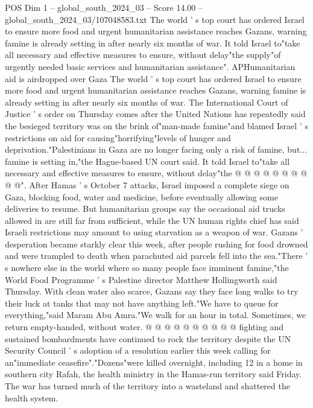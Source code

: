 \begin{textsample}{POS Dim 1 – global\_south\_2024\_03 – Score 14.00 – global\_south\_2024\_03/107048583.txt}  \label{ex:f1_pos_345}
The world ' s top court has ordered Israel to ensure more food and urgent humanitarian assistance reaches Gazans, warning famine is already setting in after nearly six months of war.
It told Israel to"take all necessary and effective measures to ensure, without delay"the supply"of urgently needed basic services and humanitarian assistance".
APHumanitarian aid is airdropped over Gaza The world ' s top court has ordered Israel to ensure more food and urgent humanitarian assistance reaches Gazans, warning famine is already setting in after nearly six months of war.
The International Court of Justice ' s order on Thursday comes after the United Nations has repeatedly said the besieged territory was on the brink of"man-made famine"and blamed Israel ' s restrictions on aid for causing"horrifying"levels of hunger and deprivation."Palestinians in Gaza are no longer facing only a risk of famine, but... famine is setting in,"the Hague-based UN court said.
It told Israel to"take all necessary and effective measures to ensure, without delay"the @ @ @ @ @ @ @ @ @ @".
After Hamas ' s October 7 attacks, Israel imposed a complete siege on Gaza, blocking food, water and medicine, before eventually allowing some deliveries to resume.
But humanitarian groups say the occasional aid trucks allowed in are still far from sufficient, while the UN human rights chief has said Israeli restrictions may amount to using starvation as a weapon of war.
Gazans ' desperation became starkly clear this week, after people rushing for food drowned and were trampled to death when parachuted aid parcels fell into the sea."There ' s nowhere else in the world where so many people face imminent famine,"the World Food Programme ' s Palestine director Matthew Hollingworth said Thursday.
With clean water also scarce, Gazans say they face long walks to try their luck at tanks that may not have anything left."We have to queue for everything,"said Maram Abu Amra."We walk for an hour in total.
Sometimes, we return empty-handed, without water. @ @ @ @ @ @ @ @ @ @ fighting and sustained bombardments have continued to rock the territory despite the UN Security Council ' s adoption of a resolution earlier this week calling for an"immediate ceasefire"."Dozens"were killed overnight, including 12 in a home in southern city Rafah, the health ministry in the Hamas-run territory said Friday.
The war has turned much of the territory into a wasteland and shattered the health system.

\end{textsample}
